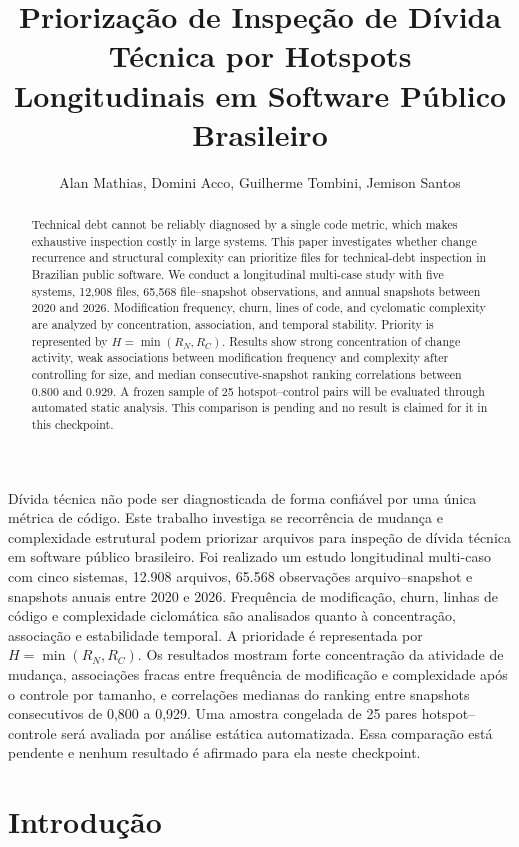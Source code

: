 \documentclass[12pt]{article}
\title{Priorização de Inspeção de Dívida Técnica por Hotspots Longitudinais em Software Público Brasileiro}
\author{Alan Mathias\inst{1}, Domini Acco\inst{1}, Guilherme Tombini\inst{1}, Jemison Santos\inst{1}}
\begin{document}
\maketitle

\begin{abstract}
Technical debt cannot be reliably diagnosed by a single code metric, which makes exhaustive inspection costly in large systems. This paper investigates whether change recurrence and structural complexity can prioritize files for technical-debt inspection in Brazilian public software. We conduct a longitudinal multi-case study with five systems, 12,908 files, 65,568 file--snapshot observations, and annual snapshots between 2020 and 2026. Modification frequency, churn, lines of code, and cyclomatic complexity are analyzed by concentration, association, and temporal stability. Priority is represented by $H=\min(R_N,R_C)$. Results show strong concentration of change activity, weak associations between modification frequency and complexity after controlling for size, and median consecutive-snapshot ranking correlations between 0.800 and 0.929. A frozen sample of 25 hotspot--control pairs will be evaluated through automated static analysis. This comparison is pending and no result is claimed for it in this checkpoint.
\end{abstract}

\begin{resumo}
Dívida técnica não pode ser diagnosticada de forma confiável por uma única métrica de código. Este trabalho investiga se recorrência de mudança e complexidade estrutural podem priorizar arquivos para inspeção de dívida técnica em software público brasileiro. Foi realizado um estudo longitudinal multi-caso com cinco sistemas, 12.908 arquivos, 65.568 observações arquivo--snapshot e snapshots anuais entre 2020 e 2026. Frequência de modificação, churn, linhas de código e complexidade ciclomática são analisados quanto à concentração, associação e estabilidade temporal. A prioridade é representada por $H=\min(R_N,R_C)$. Os resultados mostram forte concentração da atividade de mudança, associações fracas entre frequência de modificação e complexidade após o controle por tamanho, e correlações medianas do ranking entre snapshots consecutivos de 0,800 a 0,929. Uma amostra congelada de 25 pares hotspot--controle será avaliada por análise estática automatizada. Essa comparação está pendente e nenhum resultado é afirmado para ela neste checkpoint.
\end{resumo}

\section{Introdução}
\end{document}
